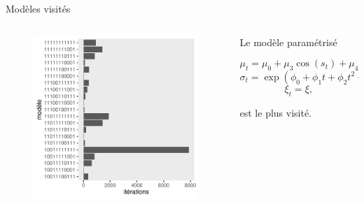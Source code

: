 \documentclass[aspectratio=169]{beamer}
\begin{document}
\begin{frame}{Modèles visités}
\begin{columns}
	\begin{column}{0.4\textwidth}
		\begin{figure}
		\vspace{-0.4cm}
	 		\includegraphics[height=0.85\textheight, center]{../figures/models.pdf}
		\end{figure}
	\end{column}
	\begin{column}{0.6\textwidth}
    Le modèle paramétrisé
    \begin{fleqn}
    \begin{equation*}
		\mu_t = \mu_0 + \mu_3 \cos(s_t) + \mu_4 \sin(s_t),
	\end{equation*}
	\begin{equation*}
		\sigma_t = \exp(\phi_0 + \phi_1 t + \phi_2 t^2 + \phi_3 \cos(s_t) + \phi_4 \sin(s_t)),
	\end{equation*}
	\begin{equation*}
		\xi_t = \xi,
	\end{equation*}
	\end{fleqn}
	est le plus visité.
	\end{column}
\end{columns}
\end{frame}
\end{document}
